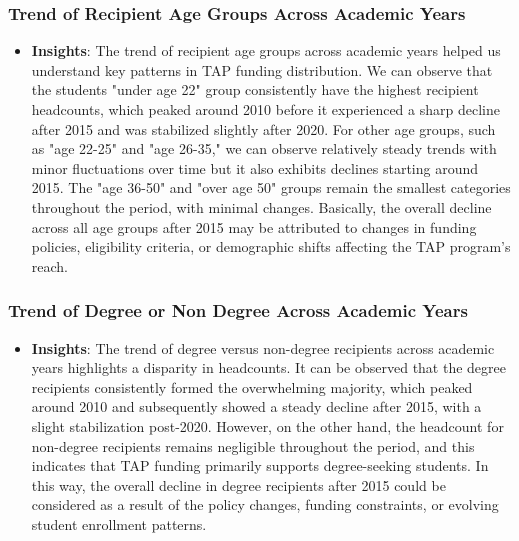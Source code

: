 \documentclass[sigconf]{acmart}
\begin{document}
\subsubsection{\textbf{Trend of Recipient Age Groups Across Academic Years}}
\begin{itemize}
    \begin{figure}[h] 
        \centering
        \texttt{[image: Viz3.png]}
        \caption{Trend of Recipient Age Groups Across Academic Years}
        \label{fig:data_viz}
    \end{figure}
    \item \textbf{Insights}:
    The trend of recipient age groups across academic years helped us understand key patterns in TAP funding distribution. We can observe that the students "under age 22" group consistently have the highest recipient headcounts, which peaked around 2010 before it experienced a sharp decline after 2015 and was stabilized slightly after 2020. For other age groups, such as "age 22-25" and "age 26-35," we can observe relatively steady trends with minor fluctuations over time but it also exhibits declines starting around 2015. The "age 36-50" and "over age 50" groups remain the smallest categories throughout the period, with minimal changes. Basically, the overall decline across all age groups after 2015 may be attributed to changes in funding policies, eligibility criteria, or demographic shifts affecting the TAP program's reach.
\end{itemize}

\subsubsection{\textbf{Trend of Degree or Non Degree Across Academic Years}}
\begin{itemize}
    \begin{figure}[h] 
        \centering
        \texttt{[image: Viz4.png]}
        \caption{Trend of Degree or Non Degree Across Academic Years}
        \label{fig:data_viz}
    \end{figure}
    \item \textbf{Insights}:
    The trend of degree versus non-degree recipients across academic years highlights a disparity in headcounts. It can be observed that the degree recipients consistently formed the overwhelming majority, which peaked around 2010 and subsequently showed a steady decline after 2015, with a slight stabilization post-2020. However, on the other hand, the headcount for non-degree recipients remains negligible throughout the period, and this indicates that TAP funding primarily supports degree-seeking students. In this way, the overall decline in degree recipients after 2015 could be considered as a result of the policy changes, funding constraints, or evolving student enrollment patterns.
\end{itemize}
\end{document}
